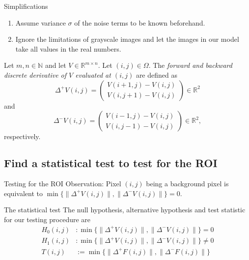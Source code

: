 \documentclass[presentation]{beamer}
\newcommand{\norm}[1]{\lVert#1\rVert}
\begin{document}
\begin{frame}{Simplifications}
	\begin{enumerate}
		\item Assume variance $\sigma$ of the noise terms to be known beforehand.
		\item Ignore the limitations of grayscale images and let the images in our model take all values in the real numbers.
	\end{enumerate}
\end{frame}

\begin{frame}
	\begin{definition}
		Let $m, n \in \mathbb{N}$ and let $V \in \mathbb{R}^{m \times n}$. Let $(i, j) \in \Omega$. The \textit{forward and backward discrete derivative of $V$ evaluated at $(i, j)$} are defined as
		\begin{equation*}
			\Delta^+ V(i, j) =
			\begin{pmatrix}
				V(i + 1, j) - V(i, j) \\
				V(i, j + 1) - V(i, j)
			\end{pmatrix}
			\in \mathbb{R}^2
		\end{equation*}
		and
		\begin{equation*}
			\Delta^- V(i, j) =
			\begin{pmatrix}
				V(i - 1, j) - V(i, j) \\
				V(i, j - 1) - V(i, j)
			\end{pmatrix}
			\in \mathbb{R}^2,
		\end{equation*}
		respectively.
	\end{definition}
\end{frame}

\subsection{Find a statistical test to test for the ROI}

\begin{frame}{Testing for the ROI}
	Observation: Pixel $(i, j)$ being a background pixel is equivalent to $\min \{ \norm{\Delta^+ V(i, j)}, \norm{\Delta^- V(i, j)} \} = 0$.
	
	\begin{block}{The statistical test}
		The null hypothesis, alternative hypothesis and test statistic for our testing procedure are
		\begin{align*}
			H_0(i, j)&: \min \{ \norm{\Delta^+ V(i, j)}, \norm{\Delta^- V(i, j)} \} = 0 \\
			H_1(i, j)&: \min \{ \norm{\Delta^+ V(i, j)}, \norm{\Delta^- V(i, j)} \} \neq 0 \\
			T(i, j) &:= \min \{ \norm{\Delta^+ F(i, j)}, \norm{\Delta^- F(i, j)} \}
		\end{align*}
	\end{block}
\end{frame}
\end{document}
